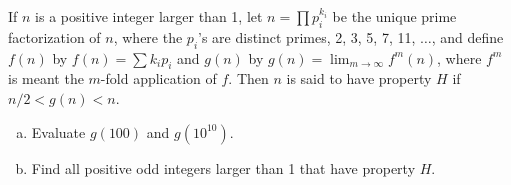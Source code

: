 If $n$ is a positive integer larger than 1, let $n = \prod p_i^{k_i}$ be the
unique prime factorization of $n$, where the $p_i$'s are distinct primes, 2, 3,
5, 7, 11, $\dots$, and define $f(n)$ by $f(n) = \sum k_i p_i$ and $g(n)$ by
$\displaystyle{g(n) = \lim_{m \to \infty} f^m(n)}$, where $f^m$ is meant the
$m$-fold application of $f$. Then $n$ is said to have property $H$ if $n/2 <
g(n) < n$.

\begin{enumerate}[(a)]
\item Evaluate $g(100)$ and $g(10^{10})$.
\item Find all positive odd integers larger than 1 that have property $H$.
\end{enumerate}
